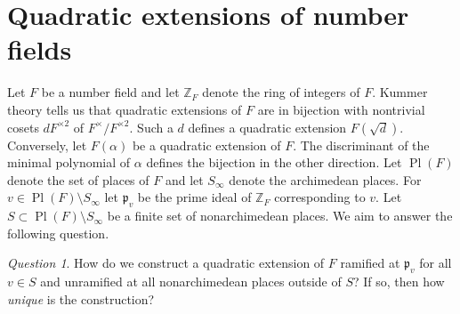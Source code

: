 \documentclass{dcthesis}
\newcommand{\ZZ}{\mathbb Z}
\DeclareMathOperator{\Pl}{Pl}
\numberwithin{equation}{section}
\theoremstyle{definition}
\theoremstyle{remark}
\newtheorem{question}[equation]{Question}
\begin{document}
{  \section{Quadratic extensions of number fields}{\label{sec:numberfields}
    Let $F$ be a number field
    and let $\ZZ_F$ denote the ring of integers
    of $F$.
    Kummer theory tells us that quadratic
    extensions of $F$ are in bijection with
    nontrivial cosets $dF^{\times 2}$ of 
    $F^\times/F^{\times 2}$.
    Such a $d$ defines a
    quadratic extension
    $F(\sqrt{d})$.
    Conversely,
    let $F(\alpha)$ be a quadratic extension of $F$.
    The discriminant of the minimal polynomial
    of $\alpha$ defines the bijection in the other
    direction.
    Let $\Pl(F)$ denote the set of places of $F$
    and let $S_\infty$ denote the archimedean
    places.
    For $v\in\Pl(F)\setminus S_\infty$
    let $\mathfrak{p}_v$
    be the prime ideal of $\ZZ_F$ corresponding
    to $v$.
    Let $S\subset\Pl(F)\setminus S_\infty$
    be a finite set of nonarchimedean places.
    We aim to answer the following question.
    \begin{question}
      \label{ques:construct}
      How do we construct a
      quadratic extension of
      $F$ ramified at $\mathfrak{p}_v$
      for all $v\in S$
      and unramified at all
      nonarchimedean places outside of $S$?
      If so, then
      how \emph{unique} is the construction?

\end{question}}}
\end{document}
